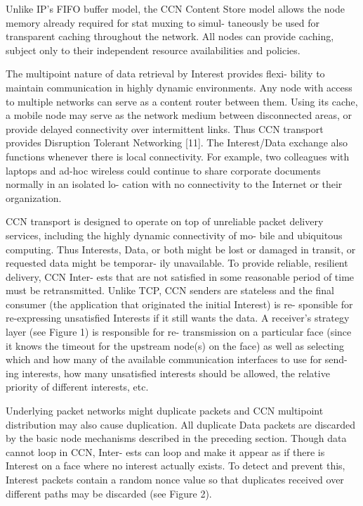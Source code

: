 \par
Unlike IP’s FIFO buffer model, the CCN Content Store model allows the node memory already required for stat muxing to simul- taneously be used for transparent caching throughout the network. All nodes can provide caching, subject only to their independent resource availabilities and policies.
\par
The multipoint nature of data retrieval by Interest provides flexi- bility to maintain communication in highly dynamic environments. Any node with access to multiple networks can serve as a content router between them. Using its cache, a mobile node may serve as the network medium between disconnected areas, or provide delayed connectivity over intermittent links. Thus CCN transport provides Disruption Tolerant Networking [11]. The Interest/Data exchange also functions whenever there is local connectivity. For example, two colleagues with laptops and ad-hoc wireless could continue to share corporate documents normally in an isolated lo- cation with no connectivity to the Internet or their organization.
\par
CCN transport is designed to operate on top of unreliable packet delivery services, including the highly dynamic connectivity of mo- bile and ubiquitous computing. Thus Interests, Data, or both might be lost or damaged in transit, or requested data might be temporar- ily unavailable. To provide reliable, resilient delivery, CCN Inter- ests that are not satisfied in some reasonable period of time must be retransmitted. Unlike TCP, CCN senders are stateless and the final consumer (the application that originated the initial Interest) is re- sponsible for re-expressing unsatisfied Interests if it still wants the data. A receiver’s strategy layer (see Figure 1) is responsible for re- transmission on a particular face (since it knows the timeout for the upstream node(s) on the face) as well as selecting which and how many of the available communication interfaces to use for send- ing interests, how many unsatisfied interests should be allowed, the relative priority of different interests, etc.
\par
Underlying packet networks might duplicate packets and CCN multipoint distribution may also cause duplication. All duplicate Data packets are discarded by the basic node mechanisms described in the preceding section. Though data cannot loop in CCN, Inter- ests can loop and make it appear as if there is Interest on a face where no interest actually exists. To detect and prevent this, Interest packets contain a random nonce value so that duplicates received over different paths may be discarded (see Figure 2).
